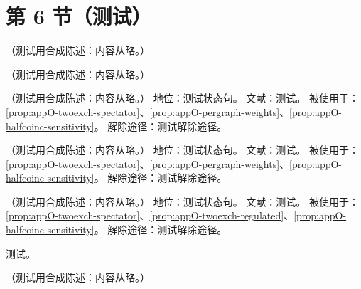 \section{第 6 节（测试）}\label{sec:appO-rewriting}

\begin{example}[单条 Glauber 交换]\label{ex:appO-single-exchange}
（测试用合成陈述：内容从略。）
\end{example}

\begin{example}\label{ex:appO-two-exchange}
（测试用合成陈述：内容从略。）
\end{example}

\begin{assumption}\label{asm:appO-adjacent-swap}
（测试用合成陈述：内容从略。）
地位：测试状态句。
文献：测试。
被使用于：\cref{prop:appO-twoexch-spectator}、\cref{prop:appO-pergraph-weights}、\cref{prop:appO-halfcoinc-sensitivity}。
解除途径：测试解除途径。
\end{assumption}

\begin{assumption}\label{asm:appO-real-jets}
（测试用合成陈述：内容从略。）
地位：测试状态句。
文献：测试。
被使用于：\cref{prop:appO-twoexch-spectator}、\cref{prop:appO-pergraph-weights}、\cref{prop:appO-halfcoinc-sensitivity}。
解除途径：测试解除途径。
\end{assumption}

\begin{assumption}\label{asm:appO-collinear-ends}
（测试用合成陈述：内容从略。）
地位：测试状态句。
文献：测试。
被使用于：\cref{prop:appO-twoexch-spectator}、\cref{prop:appO-twoexch-regulated}、\cref{prop:appO-halfcoinc-sensitivity}。
解除途径：测试解除途径。
\end{assumption}
\begin{proofsketch}测试。\end{proofsketch}

\begin{proposition}\label{prop:appO-twoexch-spectator}
（测试用合成陈述：内容从略。）
\end{proposition}
